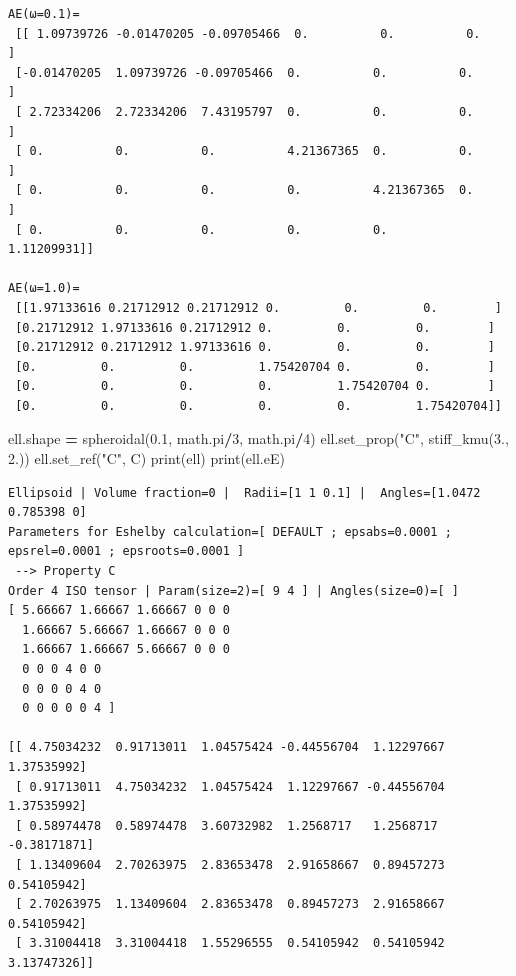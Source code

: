 \documentclass[
  a4paper,
  numbers=noendperiod,
  DIV=12]{scrreprt}
\newenvironment{Shaded}{\begin{snugshade}}{\end{snugshade}}
\newcommand{\BuiltInTok}[1]{#1}
\newcommand{\DecValTok}[1]{\textcolor[rgb]{0.00,0.00,0.81}{#1}}
\newcommand{\FloatTok}[1]{\textcolor[rgb]{0.00,0.00,0.81}{#1}}
\newcommand{\NormalTok}[1]{#1}
\newcommand{\OperatorTok}[1]{\textcolor[rgb]{0.81,0.36,0.00}{\textbf{#1}}}
\newcommand{\StringTok}[1]{\textcolor[rgb]{0.31,0.60,0.02}{#1}}
\begin{document}
\begin{verbatim}
AE(ω=0.1)=
 [[ 1.09739726 -0.01470205 -0.09705466  0.          0.          0.        ]
 [-0.01470205  1.09739726 -0.09705466  0.          0.          0.        ]
 [ 2.72334206  2.72334206  7.43195797  0.          0.          0.        ]
 [ 0.          0.          0.          4.21367365  0.          0.        ]
 [ 0.          0.          0.          0.          4.21367365  0.        ]
 [ 0.          0.          0.          0.          0.          1.11209931]] 

AE(ω=1.0)=
 [[1.97133616 0.21712912 0.21712912 0.         0.         0.        ]
 [0.21712912 1.97133616 0.21712912 0.         0.         0.        ]
 [0.21712912 0.21712912 1.97133616 0.         0.         0.        ]
 [0.         0.         0.         1.75420704 0.         0.        ]
 [0.         0.         0.         0.         1.75420704 0.        ]
 [0.         0.         0.         0.         0.         1.75420704]] 
\end{verbatim}

\begin{Shaded}
\begin{Highlighting}[]
\NormalTok{ell.shape }\OperatorTok{=}\NormalTok{ spheroidal(}\FloatTok{0.1}\NormalTok{, math.pi}\OperatorTok{/}\DecValTok{3}\NormalTok{, math.pi}\OperatorTok{/}\DecValTok{4}\NormalTok{)}
\NormalTok{ell.set\_prop(}\StringTok{"C"}\NormalTok{, stiff\_kmu(}\FloatTok{3.}\NormalTok{, }\FloatTok{2.}\NormalTok{))}
\NormalTok{ell.set\_ref(}\StringTok{"C"}\NormalTok{, C)}
\BuiltInTok{print}\NormalTok{(ell)}
\BuiltInTok{print}\NormalTok{(ell.eE)}
\end{Highlighting}
\end{Shaded}

\begin{verbatim}
Ellipsoid | Volume fraction=0 |  Radii=[1 1 0.1] |  Angles=[1.0472 0.785398 0]
Parameters for Eshelby calculation=[ DEFAULT ; epsabs=0.0001 ; epsrel=0.0001 ; epsroots=0.0001 ]
 --> Property C
Order 4 ISO tensor | Param(size=2)=[ 9 4 ] | Angles(size=0)=[ ]
[ 5.66667 1.66667 1.66667 0 0 0 
  1.66667 5.66667 1.66667 0 0 0 
  1.66667 1.66667 5.66667 0 0 0 
  0 0 0 4 0 0 
  0 0 0 0 4 0 
  0 0 0 0 0 4 ]

[[ 4.75034232  0.91713011  1.04575424 -0.44556704  1.12297667  1.37535992]
 [ 0.91713011  4.75034232  1.04575424  1.12297667 -0.44556704  1.37535992]
 [ 0.58974478  0.58974478  3.60732982  1.2568717   1.2568717  -0.38171871]
 [ 1.13409604  2.70263975  2.83653478  2.91658667  0.89457273  0.54105942]
 [ 2.70263975  1.13409604  2.83653478  0.89457273  2.91658667  0.54105942]
 [ 3.31004418  3.31004418  1.55296555  0.54105942  0.54105942  3.13747326]]
\end{verbatim}
\end{document}
